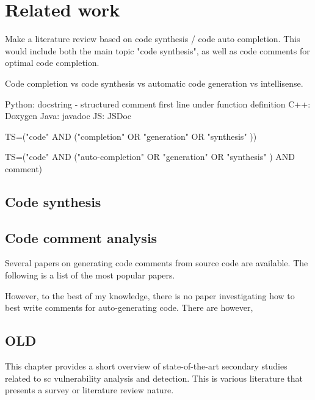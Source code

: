 \chapter{Related work}
\label{chap:related-work}

Make a literature review based on code synthesis / code auto completion. This would include both the main topic "code synthesis", as well as code comments for optimal code completion.

Code completion vs code synthesis vs automatic code generation vs intellisense.

Python: docstring  - structured comment first line under function  definition
C++: Doxygen
Java: javadoc
JS: JSDoc

TS=("code" AND ("completion" OR "generation" OR "synthesis" ))

TS=("code" AND ("auto-completion" OR "generation" OR "synthesis" ) AND comment)
\section{Code synthesis}








\section{Code comment analysis}

Several papers on generating code comments from source code are available. The following is a list of the most popular papers.

However, to the best of my knowledge, there is no paper investigating how to best write comments for auto-generating code. There are however, 



\section{OLD}
This chapter provides a short overview of state-of-the-art secondary studies related to \acrfull{sc} vulnerability analysis and detection. This is various literature that presents a survey or literature review nature.

\newcommand*\emptycirc[1][1ex]{\tikz\draw (0,0) circle (#1);} 
\newcommand*\halfcirc[1][1ex]{%
  \begin{tikzpicture}
  \draw[fill] (0,0)-- (90:#1) arc (90:270:#1) -- cycle ;
  \draw (0,0) circle (#1);
  \end{tikzpicture}}
\newcommand*\fullcirc[1][1ex]{\tikz\fill (0,0) circle (#1);} 

